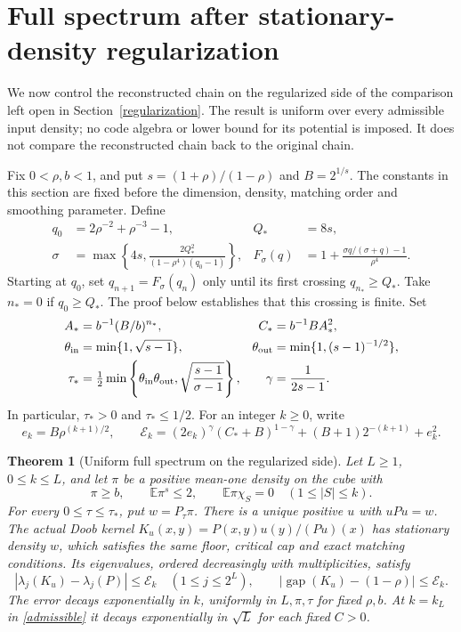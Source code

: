 \documentclass[11pt]{article}
\newcommand{\E}{\mathbb E}
\newtheorem{theorem}{Theorem}[section]
\begin{document}
\section{Full spectrum after stationary-density regularization}\label{densityspectrum}
We now control the reconstructed chain on the regularized side of the
comparison left open in Section~\ref{regularization}. The result is uniform
over every admissible input density; no code algebra or lower bound for its
potential is imposed. It does not compare the reconstructed chain back to
the original chain.

Fix $0<\rho,b<1$, and put $s=(1+\rho)/(1-\rho)$ and $B=2^{1/s}$.
The constants in this section are fixed before the dimension, density,
matching order and smoothing parameter. Define
\begin{align*}
 q_0&=2\rho^{-2}+\rho^{-3}-1,& Q_*&=8s,\\
 \sigma&=\max\left\{4s,\frac{2Q_*^2}{(1-\rho^4)(q_0-1)}\right\},&
 F_\sigma(q)&=1+\frac{\sigma q/(\sigma+q)-1}{\rho^4}.
\end{align*}
Starting at $q_0$, set $q_{n+1}=F_\sigma(q_n)$ only until its first
crossing $q_{n_*}\geq Q_*$. Take $n_*=0$ if $q_0\geq Q_*$.
The proof below establishes that this crossing is finite. Set
\begin{align*}
 A_*&=b^{-1}(B/b)^{n_*},& C_*&=b^{-1}BA_*^2,\\
 \theta_{\rm in}&=\min\{1,\sqrt{s-1}\},&
 \theta_{\rm out}&=\min\{1,(s-1)^{-1/2}\},\\
 \tau_*&=\tfrac12\min\left\{\theta_{\rm in}\theta_{\rm out},
                    \sqrt{\frac{s-1}{\sigma-1}}\right\},&
 \gamma&=\frac1{2s-1}.
\end{align*}
In particular, $\tau_*>0$ and $\tau_*\leq1/2$. For an integer $k\geq0$,
write
\begin{equation}\label{densityspectrumerror}
 e_k=B\rho^{(k+1)/2},\qquad
 \mathcal E_k=(2e_k)^\gamma(C_*+B)^{1-\gamma}
                 +(B+1)2^{-(k+1)}+e_k^2.
\end{equation}

\begin{theorem}[Uniform full spectrum on the regularized side]\label{densityspectrumtheorem}
Let $L\geq1$, $0\leq k\leq L$, and let $\pi$ be a positive mean-one
density on the cube with
\[
 \pi\geq b,\qquad \E\pi^s\leq2,\qquad
 \E\pi\chi_S=0\quad(1\leq |S|\leq k).
\]
For every $0\leq\tau\leq\tau_*$, put $w=P_\tau\pi$.
There is a unique positive $u$ with $uPu=w$. The actual Doob kernel
$K_u(x,y)=P(x,y)u(y)/(Pu)(x)$ has stationary density $w$, which satisfies
the same floor, critical cap and exact matching conditions. Its eigenvalues,
ordered decreasingly with multiplicities, satisfy
\[
 |\lambda_j(K_u)-\lambda_j(P)|\leq\mathcal E_k
       \quad(1\leq j\leq2^L),\qquad
 |\operatorname{gap}(K_u)-(1-\rho)|\leq\mathcal E_k.
\]
The error decays exponentially in $k$, uniformly in $L,\pi,\tau$ for
fixed $\rho,b$. At $k=k_L$ in \eqref{admissible} it decays exponentially
in $\sqrt L$ for each fixed $C>0$.
\end{theorem}
\end{document}
